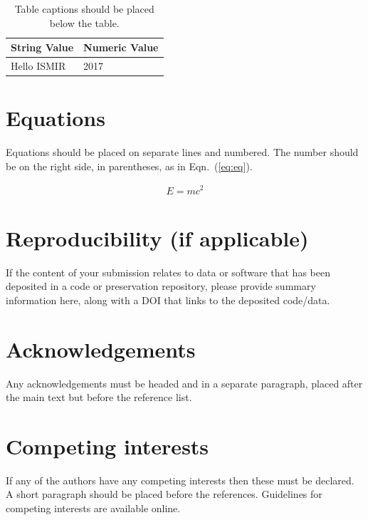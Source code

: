 \documentclass{article}
\begin{document}
\begin{table}[htpb]
\centering
  \begin{tabular}{ll}
  \toprule
  \bfseries String Value & \bfseries Numeric Value \\ \midrule
  Hello ISMIR  & 2017          \\
  \bottomrule
  \end{tabular}
  \caption{Table captions should be placed below the table.}
\label{tab:table}
\end{table}

\section{Equations}\label{sec:equations}

Equations should be placed on separate lines and numbered.
The number should be on the right side, in parentheses,
as in Eqn.~(\ref{eq:eq}).

\begin{align}\label{eq:eq}
E = mc^2
\end{align}

\section{Reproducibility (if applicable)}

If the content of your submission relates to data or software
that has been deposited in a code or preservation repository,
please provide summary information here, along with a DOI that
links to the deposited code/data.

\section{Acknowledgements}

Any acknowledgements must be headed and in a separate paragraph,
placed after the main text but before the reference list.

\section{Competing interests}

If any of the authors have any competing interests then these
must be declared. A short paragraph should be placed before
the references.
Guidelines for competing interests are available online.
\end{document}
